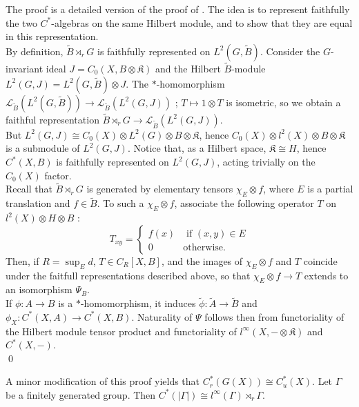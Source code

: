 \begin{dem}
The proof is a detailed version of the proof of \cite{SkTuYu}. The idea is to represent faithfully the two $C^*$-algebras on the same Hilbert module, and to show that they are equal in this representation.\\

By definition, $\tilde B\rtimes_r G$ is faithfully represented on $L^2(G,\tilde B)$. Consider the $G$-invariant ideal $J= C_0(X,B\otimes\mathfrak K)$ and the Hilbert $\tilde B$-module $L^2(G,J) = L^2(G,\tilde B)\otimes J$. The $*$-homomorphism $\mathcal L_{\tilde B}(L^2(G,\tilde B)) \rightarrow \mathcal L_{\tilde B}(L^2(G,J))$ ; $T\mapsto 1\otimes T $ is isometric, so we obtain a faithful representation $\tilde B\rtimes_r G \rightarrow \mathcal L_{\tilde B}(L^2(G,J))$.\\

But $L^2(G,J)  \cong C_0(X) \otimes L^2(G)\otimes B\otimes \mathfrak K$, hence $C_0(X)\otimes l^2(X) \otimes B \otimes \mathfrak K$ is a submodule of $L^2(G,J)$. Notice that, as a Hilbert space, $\mathfrak K \cong H$, hence $C^*(X,B)$ is faithfully represented on $L^2(G,J)$, acting trivially on the $C_0(X)$ factor. \\

Recall that $\tilde B\rtimes_r G$ is generated by elementary tensors $\chi_E\otimes f$, where $E$ is a partial translation and $f\in\tilde B$. To such a $\chi_E\otimes f$, associate the following operator $T$ on $l^2(X)\otimes H\otimes B$ : 
\[T_{xy} =\left\{\begin{array}{ll} f(x) & \text{ if }(x,y)\in E\\ 0 & \text{otherwise.}\end{array}\right. \]
Then, if $R=\sup_E d$, $T\in C_R[X,B]$, and the images of $\chi_E\otimes f$ and $T$ coincide under the faitfull representations described above, so that $\chi_E\otimes f\rightarrow T$ extends to an isomorphism $\Psi_B$.\\

If $\phi : A\rightarrow B$ is a $*$-homomorphism, it induces $\tilde \phi : \tilde A\rightarrow \tilde B$ and $\phi_X : C^*(X,A)\rightarrow C^*(X,B)$. Naturality of $\Psi$ follows then from functoriality of the Hilbert module tensor product and functoriality of $l^\infty(X, - \otimes \mathfrak K)$ and $C^*(X, - )$.\\   
\qed
\end{dem}

\begin{rk} A minor modification of this proof yields that $C_r^*(G(X))\cong C^*_u(X)$. Let $\Gamma$ be a finitely generated group. Then $C^*(| \Gamma |)\cong l^\infty( \Gamma)\rtimes_r \Gamma  $.
\end{rk}
